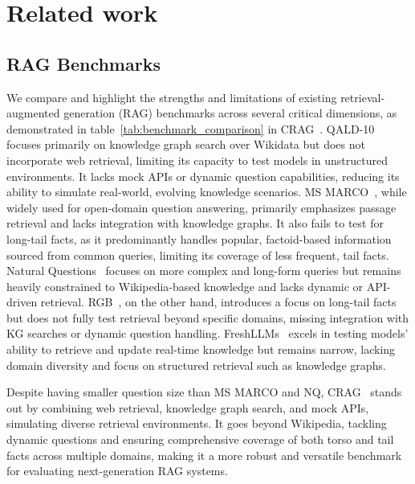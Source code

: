 \section{Related work}
\label{sec:relatedwork}
\subsection{RAG Benchmarks}
We compare and highlight the strengths and limitations of existing retrieval-augmented generation (RAG) benchmarks across several critical dimensions, as demonstrated in table~\ref{tab:benchmark_comparison} in CRAG~\cite{yang2024crag}. QALD-10~\cite{usbeck2023qald} focuses primarily on knowledge graph search over Wikidata but does not incorporate web retrieval, limiting its capacity to test models in unstructured environments. It lacks mock APIs or dynamic question capabilities, reducing its ability to simulate real-world, evolving knowledge scenarios. MS MARCO~\cite{bajaj2016ms}, while widely used for open-domain question answering, primarily emphasizes passage retrieval and lacks integration with knowledge graphs. It also fails to test for long-tail facts, as it predominantly handles popular, factoid-based information sourced from common queries, limiting its coverage of less frequent, tail facts. Natural Questions~\cite{kwiatkowski2019natural} focuses on more complex and long-form queries but remains heavily constrained to Wikipedia-based knowledge and lacks dynamic or API-driven retrieval. RGB~\cite{chen2024benchmarking}, on the other hand, introduces a focus on long-tail facts but does not fully test retrieval beyond specific domains, missing integration with KG searches or dynamic question handling. FreshLLMs~\cite{vu2023freshllms} excels in testing models’ ability to retrieve and update real-time knowledge but remains narrow, lacking domain diversity and focus on structured retrieval such as knowledge graphs. 

Despite having smaller question size than MS MARCO and NQ, CRAG~\cite{yang2024crag} stands out by combining web retrieval, knowledge graph search, and mock APIs, simulating diverse retrieval environments. It goes beyond Wikipedia, tackling dynamic questions and ensuring comprehensive coverage of both torso and tail facts across multiple domains, making it a more robust and versatile benchmark for evaluating next-generation RAG systems.



